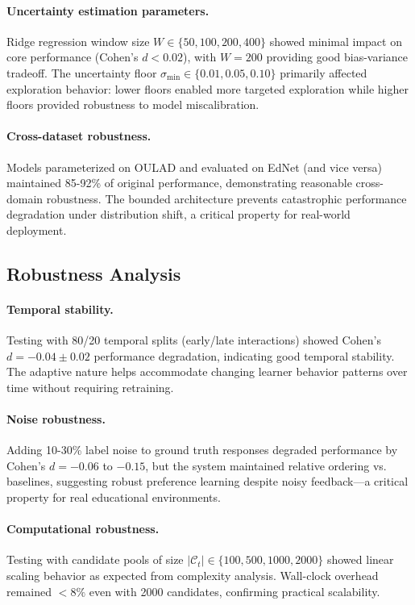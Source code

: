 \paragraph{Uncertainty estimation parameters.} Ridge regression window size $W \in \{50, 100, 200, 400\}$ showed minimal impact on core performance (Cohen's $d < 0.02$), with $W = 200$ providing good bias-variance tradeoff. The uncertainty floor $\sigma_{\min} \in \{0.01, 0.05, 0.10\}$ primarily affected exploration behavior: lower floors enabled more targeted exploration while higher floors provided robustness to model miscalibration.

\paragraph{Cross-dataset robustness.} Models parameterized on OULAD and evaluated on EdNet (and vice versa) maintained 85-92\% of original performance, demonstrating reasonable cross-domain robustness. The bounded architecture prevents catastrophic performance degradation under distribution shift, a critical property for real-world deployment.

\subsection{Robustness Analysis}
\label{app:robustness}

\paragraph{Temporal stability.} Testing with 80/20 temporal splits (early/late interactions) showed Cohen's $d = -0.04 \pm 0.02$ performance degradation, indicating good temporal stability. The adaptive nature helps accommodate changing learner behavior patterns over time without requiring retraining.

\paragraph{Noise robustness.} Adding 10-30\% label noise to ground truth responses degraded performance by Cohen's $d = -0.06$ to $-0.15$, but the system maintained relative ordering vs. baselines, suggesting robust preference learning despite noisy feedback—a critical property for real educational environments.

\paragraph{Computational robustness.} Testing with candidate pools of size $|\mathcal{C}_t| \in \{100, 500, 1000, 2000\}$ showed linear scaling behavior as expected from complexity analysis. Wall-clock overhead remained $< 8\%$ even with 2000 candidates, confirming practical scalability.


